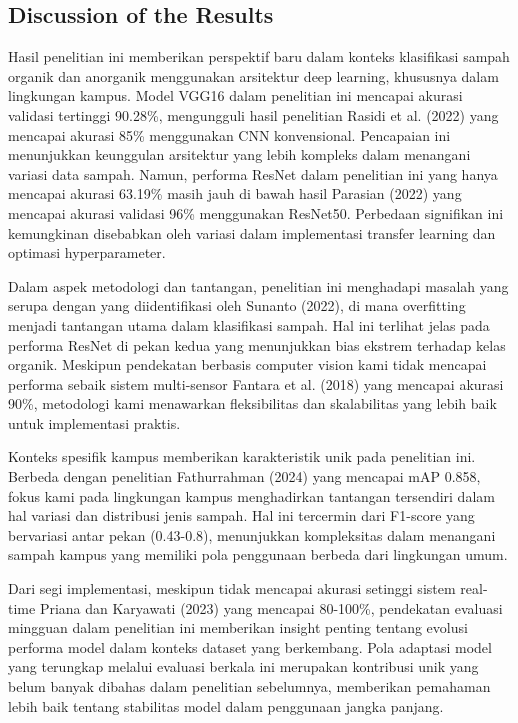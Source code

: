 \documentclass[12pt,a4paper]{article}
\begin{document}
\subsection{Discussion of the Results}
\begin{adjustwidth}{3em}{0pt}

Hasil penelitian ini memberikan perspektif baru dalam konteks klasifikasi sampah organik dan anorganik menggunakan arsitektur deep learning, khususnya dalam lingkungan kampus. Model VGG16 dalam penelitian ini mencapai akurasi validasi tertinggi 90.28\%, mengungguli hasil penelitian Rasidi et al. (2022) yang mencapai akurasi 85\% menggunakan CNN konvensional. Pencapaian ini menunjukkan keunggulan arsitektur yang lebih kompleks dalam menangani variasi data sampah. Namun, performa ResNet dalam penelitian ini yang hanya mencapai akurasi 63.19\% masih jauh di bawah hasil Parasian (2022) yang mencapai akurasi validasi 96\% menggunakan ResNet50. Perbedaan signifikan ini kemungkinan disebabkan oleh variasi dalam implementasi transfer learning dan optimasi hyperparameter.

Dalam aspek metodologi dan tantangan, penelitian ini menghadapi masalah yang serupa dengan yang diidentifikasi oleh Sunanto (2022), di mana overfitting menjadi tantangan utama dalam klasifikasi sampah. Hal ini terlihat jelas pada performa ResNet di pekan kedua yang menunjukkan bias ekstrem terhadap kelas organik. Meskipun pendekatan berbasis computer vision kami tidak mencapai performa sebaik sistem multi-sensor Fantara et al. (2018) yang mencapai akurasi 90\%, metodologi kami menawarkan fleksibilitas dan skalabilitas yang lebih baik untuk implementasi praktis.

Konteks spesifik kampus memberikan karakteristik unik pada penelitian ini. Berbeda dengan penelitian Fathurrahman (2024) yang mencapai mAP 0.858, fokus kami pada lingkungan kampus menghadirkan tantangan tersendiri dalam hal variasi dan distribusi jenis sampah. Hal ini tercermin dari F1-score yang bervariasi antar pekan (0.43-0.8), menunjukkan kompleksitas dalam menangani sampah kampus yang memiliki pola penggunaan berbeda dari lingkungan umum.

Dari segi implementasi, meskipun tidak mencapai akurasi setinggi sistem real-time Priana dan Karyawati (2023) yang mencapai 80-100\%, pendekatan evaluasi mingguan dalam penelitian ini memberikan insight penting tentang evolusi performa model dalam konteks dataset yang berkembang. Pola adaptasi model yang terungkap melalui evaluasi berkala ini merupakan kontribusi unik yang belum banyak dibahas dalam penelitian sebelumnya, memberikan pemahaman lebih baik tentang stabilitas model dalam penggunaan jangka panjang.


\end{adjustwidth}
\end{document}
